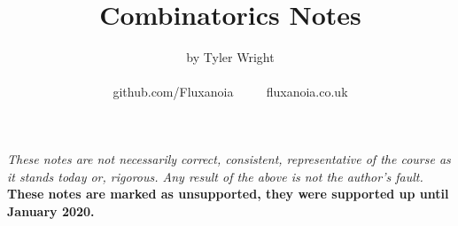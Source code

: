 \documentclass[a4paper, 12pt, twoside]{article}
\begin{document}
\title{Combinatorics Notes}
\date{}
\author{by Tyler Wright \\
  \\
  github.com/Fluxanoia $\qquad$ fluxanoia.co.uk
}
\maketitle

\vfill

\textit{These notes are not necessarily correct,
consistent, representative of the course as it stands today or, 
rigorous. Any result of the above is not the author's fault.}
\\[\baselineskip]
\textbf{These notes are marked as unsupported, they were supported
up until January 2020.}

\addtocounter{section}{-1}



\newpage

\tableofcontents











\end{document}
